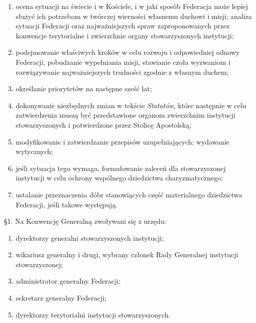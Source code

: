 \begin{enumerate}


\item ocena sytuacji na świecie i w Kościele, i w jaki sposób Federacja może lepiej służyć ich potrzebom w twórczej wierności własnemu duchowi i misji; analiza sytuacji Federacji oraz najważniejszych spraw zaproponowanych przez konwencje terytorialne i zwierzchnie organy stowarzyszonych instytucji;


\item podejmowanie właściwych kroków w celu rozwoju i odpowiedniej odnowy Federacji, pobudzanie wypełniania misji, stawianie czoła wyzwaniom i rozwiązywanie najważniejszych trudności zgodnie z własnym duchem;


\item określanie priorytetów na następne sześć lat;


\item dokonywanie niezbędnych zmian w tekście {\em Statutów}, które następnie w celu zatwierdzenia muszą być przedstawione organom zwierzchnim instytucji stowarzyszonych i potwierdzone przez Stolicę Apostolską;


\item modyfikowanie i zatwierdzanie przepisów uzupełniających; wydawanie wytycznych;


\item jeśli sytuacja tego wymaga, formułowanie zaleceń dla stowarzyszonej instytucji  w celu ochrony wspólnego dziedzictwa charyzmatycznego;


\item ustalanie przeznaczenia dóbr stanowiących część materialnego dziedzictwa Federacji, jeśli takowe występują.  


\end{enumerate}




 \S{}1. Na Konwencję Generalną zwoływani się z urzędu:


\begin{enumerate}


\item dyrektorzy generalni stowarzyszonych instytucji;


\item wikariusz generalny i drugi, wybrany członek Rady Generalnej instytucji stowarzyszonej;


\item administrator generalny Federacji;


\item sekretarz generalny Federacji;


\item dyrektorzy terytorialni instytucji stowarzyszonych.


\end{enumerate}


